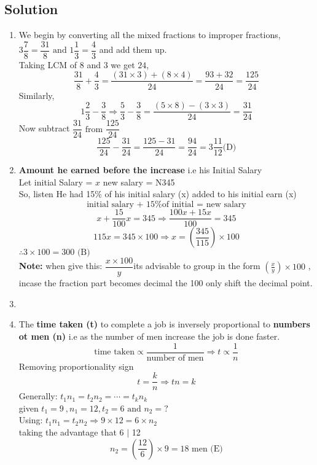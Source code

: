 \subsection{Solution}
\begin{multicols}{2}
\begin{enumerate}[label={\arabic*.}]
    \item We begin by converting all the mixed fractions to improper fractions,\\
    \(3\dfrac{7}{8} = \dfrac{31}{8} \text { and } 1\dfrac{1}{3} = \dfrac{4}{3}\) and add them up. \\ 
    Taking LCM of \(8\) and \(3\) we get \(24\),
    \[\frac{31}{8} + \frac{4}{3} = \frac{(31 \times 3) + (8 \times 4) }{24} = \frac{93 + 32}{24} = \dfrac{125}{24} \]
    Similarly, 
    \[1\frac{2}{3} - \frac{3}{8} \Rightarrow \frac{5}{3} - \frac{3}{8} = \frac{(5 \times 8) - (3 \times 3)}{24} = \frac{31}{24}\]
    Now subtract \(\dfrac{31}{24} \text { from } \dfrac{125}{24}\)
    \[\frac{125}{24} - \frac{31}{24} = \frac{125 - 31}{24} = \frac{94}{24} = 3\frac{11}{12} \text{(D)} \]
    
    \item \textbf{Amount he earned before the increase} i.e his Initial Salary \\
    Let initial Salary = \(x\) \hspace {10px}  new salary = N345\\
    So, listen He had 15\% of his initial salary (x) added to his initial earn (x)
    \[\text{initial salary + 15\% of initial = new salary}\]
    \[x + \dfrac{15}{100}x = 345 \Rightarrow \dfrac{100x + 15x}{100} = 345\]
    \[115x = 345 \times 100 \Rightarrow x = \left(\frac{345}{115}\right) \times 100\]
    \(\therefore 3 \times 100 = 300 \text{ (B)}\)\\
    \textbf{Note:} when give this: \( \dfrac{x \times 100}{y}\)its advisable to group in the form
    \(\left(\frac{x}{y}\right) \times 100\) , incase the fraction part becomes decimal the 100 only shift the
    decimal point. 

    \item
    \item The \textbf{time taken (t)} to complete a job is inversely proportional to \textbf{numbers ot men (n)} 
    i.e as the number of men increase the job is done faster. 
    \begin{equation}
        \text{time taken} \propto \dfrac{1}{\text{number of men}} \Rightarrow t \propto \dfrac{1}{n}
    \end {equation}
    Removing proportionality sign
    \[t = \dfrac{k}{n} \Rightarrow tn = k\]
    Generally: \(t_{1}n_{1} = t_{2}n_2 = \cdots = t_{k}n_{k}\)\\
    given \(t_{1} = 9\ , n_{1} = 12 , t_{2} = 6 \text{ and } n_{2} = ?\) \\
    Using: \(t_{1}n_{1} = t_{2}n_{2} \Rightarrow 9 \times 12 = 6 \times n_{2}\) \\
    taking the advantage that 6 $\mid$ 12 
    \[n_{2} = \left(\frac{12}{6}\right) \times 9 = 18 \text { men (E)}\]


\end{enumerate}
\end{multicols}

